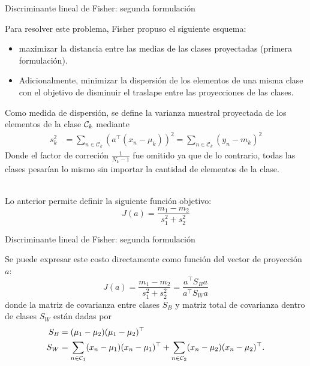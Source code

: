 \documentclass[9pt]{beamer}
\begin{document}
\begin{frame}{Discriminante lineal de Fisher: segunda formulación}

Para resolver este problema, Fisher propuso el siguiente esquema:

\begin{itemize}
	\item maximizar la distancia entre las medias de las clases proyectadas (primera formulación).\pause
	\item Adicionalmente, minimizar la dispersión de los elementos de una misma clase con el objetivo de disminuir el traslape entre las proyecciones de las clases.\pause
\end{itemize}

 Como medida de dispersión, se define la varianza muestral proyectada de los elementos de la clase ${\mathcal C}_k$ mediante
\begin{align*}
	s_k^2 &= \sum_{n\in \mathcal{C}_k}(a^\top(x_n-\mu_k))^2= \sum_{n\in \mathcal{C}_k}(y_n-m_k)^2
\end{align*}
Donde el factor de correción $\frac{1}{N_k-1}$ fue omitido ya que de lo contrario, todas las clases pesarían lo mismo sin importar la cantidad de elementos de la clase.\\~\ \pause

Lo anterior permite definir la siguiente función objetivo:
\begin{equation*}
J(a) = \frac{m_1-m_2}{s_1^2+s_2 ^2}
\end{equation*}

\end{frame}


\begin{frame}{Discriminante lineal de Fisher: segunda formulación}

Se puede expresar este costo directamente como función del vector de proyección $a$:
\begin{equation*}
	J(a) = \frac{m_1-m_2}{s_1^2+s_2 ^2} = \frac{a^\top S_B a}{a^\top S_Wa}
\end{equation*}
donde la matriz de covarianza entre clases $S_B$ y matriz total de covarianza dentro de clases $S_W$ están dadas por
\begin{align*}
	S_B &= (\mu_1-\mu_2)(\mu_1-\mu_2)^\top\\
	S_W &= \sum_{n\in {\mathcal C}_1}(x_n-\mu_1)(x_n-\mu_1)^\top +
	\sum_{n\in {\mathcal C}_2}(x_n-\mu_2)(x_n-\mu_2)^\top. 
\end{align*}

\end{frame}
\end{document}
